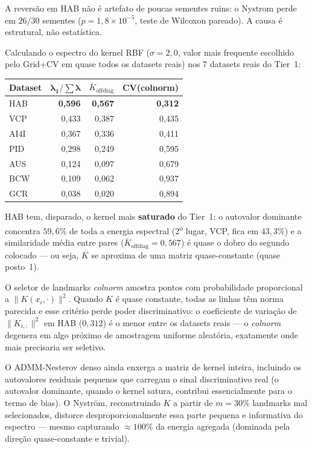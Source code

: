 \documentclass[12pt,a4paper]{article}
\begin{document}
\begin{tcolorbox}[colback=warnbg, colframe=warnborder, fonttitle=\bfseries,
  title=\textbf{Achado --- HAB: o kernel saturado degenera a seleção
  \emph{colnorm} e o Nyström piora o ADMM}]
A reversão em HAB não é artefato de poucas sementes ruins: o Nystrom perde em
$26/30$ sementes ($p=1{,}8\times10^{-5}$, teste de Wilcoxon pareado). A causa
é estrutural, não estatística.

Calculando o espectro do kernel RBF ($\sigma=2{,}0$, valor mais frequente
escolhido pelo Grid+CV em quase todos os datasets reais) nos 7 datasets reais
do Tier~1:

\begin{center}
\begin{tabular}{lrrr}
\toprule
\textbf{Dataset} & $\boldsymbol{\lambda_1/\sum\lambda}$ & \textbf{$\overline{K}_{\text{offdiag}}$}
  & \textbf{CV(colnorm)} \\
\midrule
HAB  & \textbf{0,596} & \textbf{0,567} & \textbf{0,312} \\
VCP  & 0,433 & 0,387 & 0,435 \\
AI4I & 0,367 & 0,336 & 0,411 \\
PID  & 0,298 & 0,249 & 0,595 \\
AUS  & 0,124 & 0,097 & 0,679 \\
BCW  & 0,109 & 0,062 & 0,937 \\
GCR  & 0,038 & 0,020 & 0,894 \\
\bottomrule
\end{tabular}
\end{center}

HAB tem, disparado, o kernel mais \textbf{saturado} do Tier~1: o autovalor
dominante concentra $59{,}6\%$ de toda a energia espectral (2\textsuperscript{o}
lugar, VCP, fica em $43{,}3\%$) e a similaridade média entre pares
($\overline{K}_{\text{offdiag}} = 0{,}567$) é quase o dobro do segundo colocado
--- ou seja, $K$ se aproxima de uma matriz quase-constante (quase posto~1).

O seletor de landmarks \emph{colnorm} amostra pontos com probabilidade
proporcional a $\|K(x_i,\cdot)\|^2$. Quando $K$ é quase constante, todas as
linhas têm norma parecida e esse critério perde poder discriminativo: o
coeficiente de variação de $\|K_{i,:}\|^2$ em HAB ($0{,}312$) é o menor entre
os datasets reais --- o \emph{colnorm} degenera em algo próximo de amostragem
uniforme aleatória, exatamente onde mais precisaria ser seletivo.

O ADMM-Nesterov denso ainda enxerga a matriz de kernel inteira, incluindo os
autovalores residuais pequenos que carregam o sinal discriminativo real (o
autovalor dominante, quando o kernel satura, contribui essencialmente para o
termo de bias). O Nyström, reconstruindo $K$ a partir de $m=30\%$ landmarks
mal selecionados, distorce desproporcionalmente essa parte pequena e
informativa do espectro --- mesmo capturando $\approx 100\%$ da energia
agregada (dominada pela direção quase-constante e trivial).


\end{tcolorbox}
\end{document}
